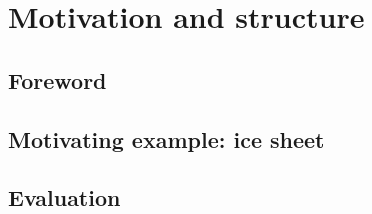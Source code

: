 \section{Motivation and structure}

\subsection{Foreword}


\subsection{Motivating example: ice sheet}


\subsection{Evaluation}


